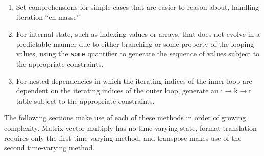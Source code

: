 \begin{enumerate}
  \item{Set comprehensions for simple cases that are easier to reason about, handling iteration ``en masse''}
  \item{For internal state, such as indexing values or arrays, that does not evolve in a predictable manner due to either branching or some property of the looping values, using the \texttt{some} quantifier to generate the sequence of values subject to the appropriate constraints.}
  \item{For nested dependencies in which the iterating indices of the inner loop are dependent on the iterating indices of the outer loop, generate an i$\rightarrow$k$\rightarrow$t table subject to the appropriate constraints.}
\end{enumerate}

The following sections make use of each of these methods in order of growing complexity.  Matrix-vector multiply has no time-varying state, format translation requires only the first time-varying method, and transpose makes use of the second time-varying method.